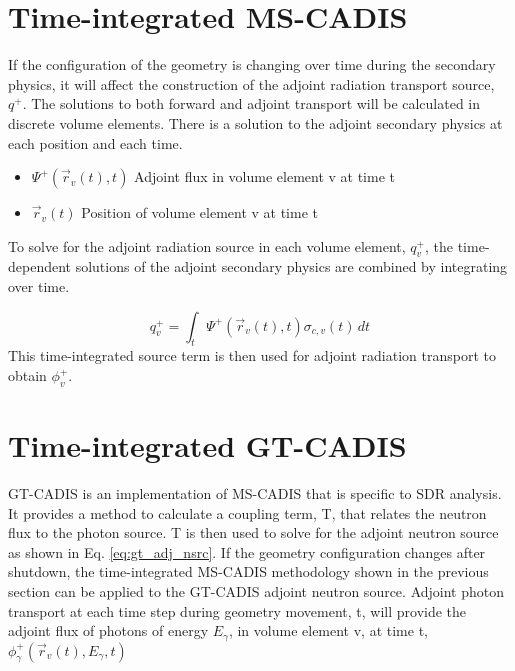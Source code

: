 \section{Time-integrated MS-CADIS}
If the configuration of the geometry is changing over time during
the secondary physics, it will affect the construction of the adjoint radiation
transport source, $q^{+}$.  
The solutions to both forward and adjoint transport will be calculated in discrete
volume elements. There is a solution to the adjoint secondary
physics at each position and each time.%
\begin{itemize}
	\item	{$ \Psi^{+}(\overrightarrow{r}_{v}(t), t)$ Adjoint flux in volume
		element v at time t}
	\item  {$\overrightarrow{r}_{v}(t)$ Position of volume element v at
		time t}
\end{itemize}
To solve for the adjoint radiation source in each volume element,
$q_{v}^{+}$, the time-dependent solutions of the 
adjoint secondary physics are combined by integrating over time.

 \begin{equation}\label{eq:adj_src_1_avg}
	 q_{v}^{+} =
	 \int_{t}  \Psi^{+}(\overrightarrow{r}_{v}(t), t)
	 \sigma_{c,v}(t)\, dt
 \end{equation}
This time-integrated source term is then used
for adjoint radiation transport to obtain $\phi_{v}^{+}$.

\section{Time-integrated GT-CADIS}
GT-CADIS is an implementation of MS-CADIS that is specific to SDR analysis.  It
provides a method to calculate a coupling term, T, that relates the neutron
flux to the photon source.
T is then used to solve for the adjoint neutron source as shown in Eq.
\ref{eq:gt_adj_nsrc}.
If the geometry configuration changes after shutdown, the time-integrated
MS-CADIS methodology shown in the previous section can be applied to the
GT-CADIS adjoint neutron source.  Adjoint photon transport at each time step
during geometry movement, t, will provide the adjoint flux 
of photons of energy $E_{\gamma}$, in volume element v, at time t,
$\phi_{\gamma}^{+}(\overrightarrow{r}_{v}(t), E_{\gamma},t) $

